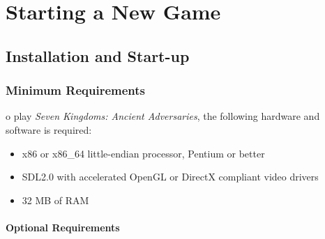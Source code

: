 
\chapter{Starting a New Game}


\section{Installation and Start-up}


\subsection{Minimum Requirements}


o play \textit{Seven Kingdoms: Ancient Adversaries}, the following hardware and software is required:

\begin{itemize}
	\item x86 or x86\_64 little-endian processor, Pentium or better
	\item SDL2.0 with accelerated OpenGL or DirectX compliant video drivers
	\item 32 MB of RAM
\end{itemize}

\subsubsection{Optional Requirements}

